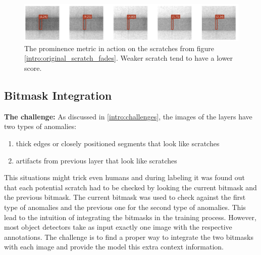 \begin{figure}[!h]
\centering
\captionsetup{justification=centering,margin=2cm}
\includegraphics[width=\columnwidth]{images/implementation/marked_scratch_fades}
\caption{The prominence metric in action on the scratches from figure \ref{intro:original_scratch_fades}. Weaker scratch tend to have a lower score.}
\label{impl:marked_scratch_fades}
\end{figure}

\subsection{Bitmask Integration}
\label{subsection:bm}

\textbf{The challenge:}
As discussed in \ref{intro:challenges}, the images of the layers have two types of anomalies:
\begin{enumerate}
\item thick edges or closely positioned segments that look like scratches
\item artifacts from previous layer that look like scratches
\end{enumerate}

This situations might trick even humans and during labeling it was found out that each potential scratch had to be checked by looking the current bitmask and the previous bitmask. The current bitmask was used to check against the first type of anomalies and the previous one for the second type of anomalies. This lead to the intuition of integrating the bitmasks in the training process.
 However, most object detectors take as input exactly one image with the respective annotations. The challenge is to find a proper way to integrate the two bitmasks with each image and provide the model this extra context information.\\


